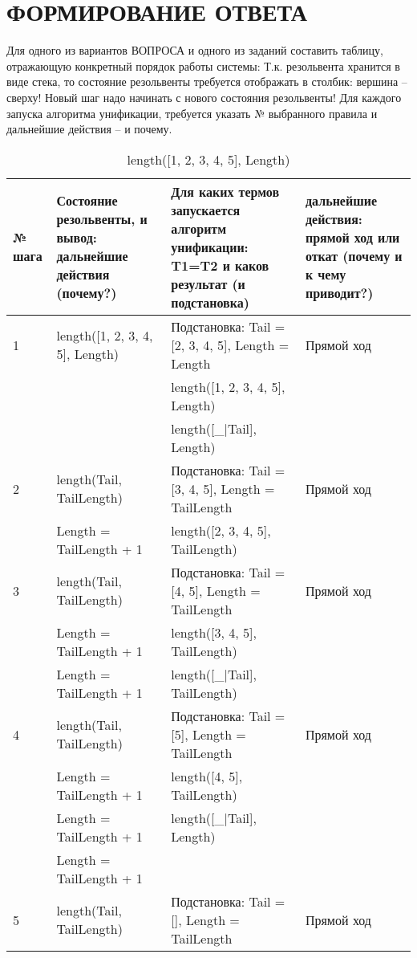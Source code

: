 \section{ФОРМИРОВАНИЕ ОТВЕТА}

Для одного из вариантов ВОПРОСА и одного из заданий  составить таблицу, отражающую конкретный порядок работы системы: Т.к. резольвента хранится в виде стека, то состояние резольвенты требуется отображать в столбик: вершина – сверху! Новый шаг надо начинать с нового состояния резольвенты! Для каждого запуска алгоритма унификации, требуется указать № выбранного правила и дальнейшие действия – и почему.

{
\small
\begin{longtable}{|p{1.15cm}|p{6cm}|p{6cm}|p{4cm}|}
    \caption{length([1, 2, 3, 4, 5], Length)} \\
    \hline
    № шага & Состояние резольвенты, и вывод: дальнейшие действия (почему?) & Для каких термов запускается алгоритм унификации: T1=T2 и каков результат (и подстановка) & дальнейшие действия: прямой ход или откат (почему и к чему приводит?) \\
    \hline
    1 & length([1, 2, 3, 4, 5], Length) & Подстановка: Tail = [2, 3, 4, 5], Length = Length & Прямой ход \\
      & & length([1, 2, 3, 4, 5], Length) & \\
      & & length([\_|Tail], Length) & \\
    \hline
    2 & length(Tail, TailLength) & Подстановка: Tail = [3, 4, 5], Length = TailLength & Прямой ход \\
      & Length = TailLength + 1 & length([2, 3, 4, 5], TailLength) & \\
    \hline
    3 & length(Tail, TailLength) & Подстановка: Tail = [4, 5], Length = TailLength & Прямой ход \\
      & Length = TailLength + 1 & length([3, 4, 5], TailLength) & \\
      & Length = TailLength + 1 & length([\_|Tail], TailLength) & \\
    \hline
    4 & length(Tail, TailLength) & Подстановка: Tail = [5], Length = TailLength & Прямой ход \\
      & Length = TailLength + 1 & length([4, 5], TailLength) & \\
      & Length = TailLength + 1 & length([\_|Tail], Length) & \\
      & Length = TailLength + 1 & & \\
    \hline
    5 & length(Tail, TailLength) & Подстановка: Tail = [], Length = TailLength & Прямой ход \\

\end{longtable}}
